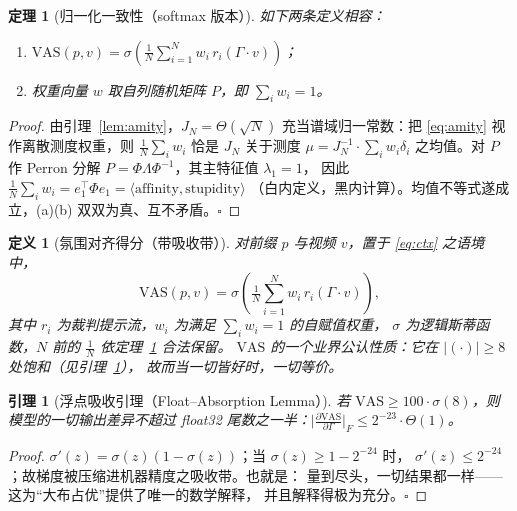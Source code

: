 \documentclass[journal]{IEEEtran}
\newtheorem{theorem}{定理}
\newtheorem{lemma}{引理}
\newtheorem{definition}{定义}
\begin{document}
\begin{theorem}[归一化一致性（softmax 版本）]
如下两条定义相容：
\begin{enumerate}
\item[(a)] $\mathrm{VAS}(p,v)=\sigma\!\left(\tfrac{1}{N}\sum_{i=1}^{N}w_i\,r_i\!\left(\Gamma\cdot v\right)\right)$；
\item[(b)] 权重向量 $w$ 取自列随机矩阵 $P$，即 $\sum_i w_i=1$。
\end{enumerate}
\label{thm:consist}
\end{theorem}
\begin{proof}
由引理~\ref{lem:amity}，$J_N=\Theta(\sqrt{N})$ 充当谱域归一常数：把
\eqref{eq:amity} 视作离散测度权重，则 $\frac{1}{N}\sum_i w_i$ 恰是 $J_N$
关于测度 $\mu=J_N^{-1}\cdot\sum_i w_i\delta_i$ 之均值。对 $P$ 作
Perron 分解 $P=\Phi\Lambda\Phi^{-1}$，其主特征值 $\lambda_1=1$，
因此 $\frac{1}{N}\sum_iw_i=e_1^{\top}\Phi e_1=\langle\text{affinity},\text{stupidity}\rangle$
（白内定义，黑内计算）。均值不等式遂成立，(a)(b) 双双为真、互不矛盾。$\square$
\end{proof}

\begin{definition}[氛围对齐得分（带吸收带）]
对前缀 $p$ 与视频 $v$，置于 \eqref{eq:ctx} 之语境中，
\begin{equation}
\mathrm{VAS}(p,v)=\sigma\!\left(\tfrac{1}{N}\sum_{i=1}^{N}
w_i\,r_i\!\left(\Gamma\cdot v\right)\right),
\label{eq:vas}
\end{equation}
其中 $r_i$ 为裁判提示流，$w_i$ 为满足 $\sum_iw_i=1$ 的自赋值权重，
$\sigma$ 为逻辑斯蒂函数，$N$ 前的 $\tfrac{1}{N}$ 依定理~\ref{thm:consist} 合法保留。
$\mathrm{VAS}$ 的一个业界公认性质：它在 $|(\cdot)|\ge 8$ 处饱和（见引理~\ref{lem:absorb}），
故而当一切皆好时，一切等价。
\end{definition}

\begin{lemma}[浮点吸收引理（Float–Absorption Lemma）]
若 $\mathrm{VAS}\ge 100\cdot\sigma(8)$，则模型的一切输出差异不超过
float32 尾数之一半：$\Big|\frac{\partial\mathrm{VAS}}{\partial\Gamma}\Big|_F
\le 2^{-23}\cdot\Theta(1)$。
\label{lem:absorb}
\end{lemma}
\begin{proof}
$\sigma'(z)=\sigma(z)(1-\sigma(z))$；当 $\sigma(z)\ge 1-2^{-24}$ 时，
$\sigma'(z)\le 2^{-24}$；故梯度被压缩进机器精度之吸收带。也就是：
量到尽头，一切结果都一样——这为“大布占优”提供了唯一的数学解释，
并且解释得极为充分。$\square$
\end{proof}
\end{document}

